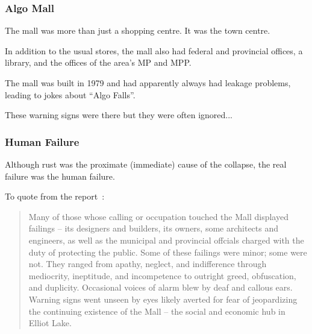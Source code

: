 \begin{frame}
\frametitle{Algo Mall}

The mall was more than just a shopping centre. It was the town centre.

In addition to the usual stores, the mall also had federal and provincial offices, a library, and the offices of the area's MP and MPP.

The mall was built in 1979 and had apparently always had leakage problems, leading to jokes about ``Algo Falls''.

These warning signs were there but they were often ignored... 

\end{frame}



\begin{frame}
\frametitle{Human Failure}

Although rust was the proximate (immediate) cause of the collapse, the real failure was the human failure. 

To quote from the report~\cite{eli}:

\begin{quote}
Many of those whose calling or occupation touched the Mall displayed failings  --  its designers and builders, its owners, some architects and engineers, as well as the municipal and provincial offcials charged with the duty of protecting the public. Some of these failings were minor; some were not. They ranged from apathy, neglect, and indifference through mediocrity, ineptitude, and incompetence to outright greed, obfuscation, and duplicity. Occasional voices of alarm blew by deaf and callous ears. Warning signs went unseen by eyes likely averted for fear of jeopardizing the continuing existence of the Mall  --  the social and economic
hub in Elliot Lake.
\end{quote}


\end{frame}



